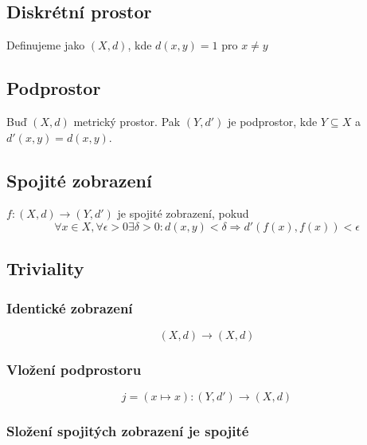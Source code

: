 \documentclass[../main.tex]{subfiles}
\begin{document}
\subsection{Diskrétní prostor}
\hspace{1.2mm}
Definujeme jako $(X,d)$, kde $d(x,y) = 1$ pro $x \neq y$
\noindent

\subsection{Podprostor}
\hspace{1.2mm}
Buď $(X, d)$ metrický prostor. Pak $(Y, d')$ je podprostor, kde $Y \subseteq X$ a $d'(x,y) = d(x,y)$.

\subsection{Spojité zobrazení}
\hspace{1.2mm}
$f: (X,d) \to (Y, d')$ je spojité zobrazení, pokud
\[ \forall x \in X, \forall \epsilon > 0 \exists \delta > 0:
d(x,y) < \delta \Rightarrow d'(f(x), f(x)) < \epsilon \]

\subsection{Triviality}
\subsubsection{Identické zobrazení}

\hspace{1.2mm}
\[ (X,d) \to (X,d) \]

\subsubsection{Vložení podprostoru}

\hspace{1.2mm}
\[ j = (x \mapsto x): (Y,d') \to (X,d) \]

\subsubsection{Složení spojitých zobrazení je spojité}
\end{document}

